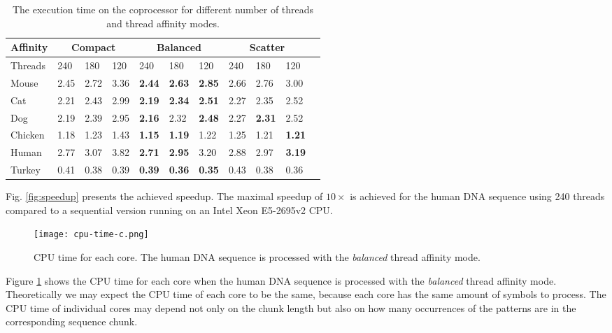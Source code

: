 \documentclass[conference]{IEEEtran}
\begin{document}
\begin{table}
	\caption{The execution time on the coprocessor for different number of threads and thread affinity modes.}
	\label{table:affinity}
	\centering
	\begin{tabular}{p{0.65cm}p{0.4cm}p{0.4cm}p{0.4cm}p{0.4cm}p{0.4cm}p{0.4cm}p{0.4cm}p{0.4cm}p{0.4cm}p{0.4cm}}
		\toprule
		Affinity & \multicolumn{3}{c}{Compact} & \multicolumn{3}{c}{Balanced} & \multicolumn{3}{c}{Scatter} \\ \midrule
		Threads & 240 & 180 & 120 & 240 & 180 & 120 & 240 & 180 & 120 \\ \midrule
		Mouse & 2.45 & 2.72 & 3.36 & \textbf{2.44} & \textbf{2.63} & \textbf{2.85} & 2.66 & 2.76 & 3.00 \\
		Cat & 2.21 & 2.43 & 2.99 & \textbf{2.19} & \textbf{2.34} & \textbf{2.51} & 2.27 & 2.35 & 2.52 \\
		Dog & 2.19 & 2.39 & 2.95 & \textbf{2.16} & 2.32 & \textbf{2.48} & 2.27 & \textbf{2.31} & 2.52 \\
		Chicken & 1.18 & 1.23 & 1.43 & \textbf{1.15} & \textbf{1.19} & 1.22 & 1.25 & 1.21 & \textbf{1.21} \\
		Human & 2.77 & 3.07 & 3.82 & \textbf{2.71} & \textbf{2.95} & 3.20 & 2.88 & 2.97 & \textbf{3.19} \\
		Turkey & 0.41 & 0.38 & 0.39 & \textbf{0.39} & \textbf{0.36} & \textbf{0.35} & 0.43 & 0.38 & 0.36 \\ \bottomrule
	\end{tabular}
\end{table}

Fig. \ref{fig:speedup} presents the achieved speedup. The maximal speedup of $10\times$ is achieved for the human DNA sequence using 240 threads compared to a sequential version running on an Intel Xeon E5-2695v2 CPU.

\begin{figure}[!t]
	\centering
	\texttt{[image: cpu-time-c.png]}
	\caption{CPU time for each core. The human DNA sequence is processed with the \emph{balanced} thread affinity mode.}
	\label{fig:core-allocation}
\end{figure} 

Figure \ref{fig:core-allocation} shows the CPU time for each core when the human DNA sequence is processed with the \emph{balanced} thread affinity mode. Theoretically we may expect the CPU time of each core to be the same, because each core has the same amount of symbols to process. The CPU time of individual cores may depend not only on the chunk length but also on how many occurrences of the patterns are in the corresponding sequence chunk.
\end{document}
